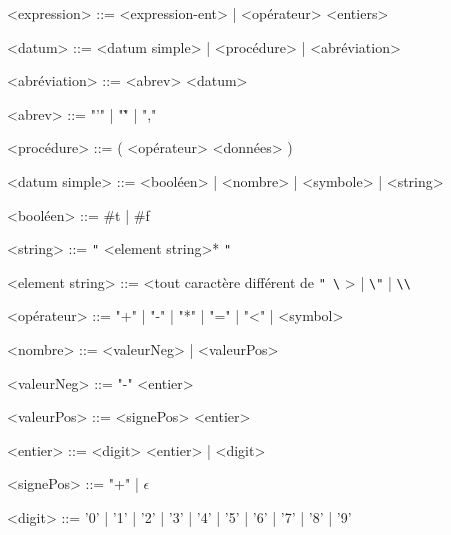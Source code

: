 
	\begin{grammarC}{<expression> ::= <expression-ent> | <opérateur> <entiers>}
		
		<datum> ::= <datum simple> | <procédure> | <abréviation>
		
		<abréviation> ::= <abrev> <datum>
		
		<abrev> ::= "'" | \space "\`" | ","
		
		<procédure> ::= ( <opérateur> <données> )
				
		<datum simple> ::= <booléen> | <nombre> | <symbole> | <string>
		
		<booléen> ::= \#t | \#f
		
		<string> ::= \verb|"| <element string>* \verb|"|
		
		<element string> ::= <tout caractère différent de \verb|" \|  > | 	\verb|\"| | \verb|\\|
		
		<opérateur> ::= "+" | "-" | "*" | "=" | "<" | <symbol>
		
		<nombre> ::= <valeurNeg> | <valeurPos>
		
		<valeurNeg> ::= "-" <entier>
		
		<valeurPos> ::= <signePos> <entier>
		
		<entier> ::= <digit> <entier> | <digit>
		
		<signePos> ::= "+" | $\epsilon$ 
		
		<digit> ::= '0' | '1' | '2' | '3' | '4' | '5' | '6' | '7' | '8' | '9'		
		
	\end{grammarC}

